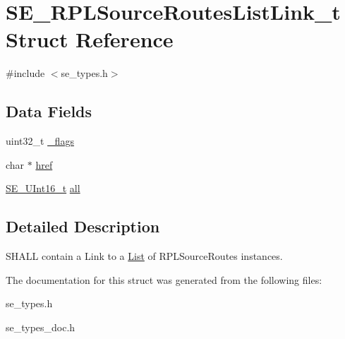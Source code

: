 \hypertarget{structSE__RPLSourceRoutesListLink__t}{}\section{S\+E\+\_\+\+R\+P\+L\+Source\+Routes\+List\+Link\+\_\+t Struct Reference}
\label{structSE__RPLSourceRoutesListLink__t}


{\ttfamily \#include $<$se\+\_\+types.\+h$>$}

\subsection*{Data Fields}
\begin{DoxyCompactItemize}
\item 
uint32\+\_\+t \hyperlink{group__RPLSourceRoutesListLink_gacc50a570981ab981f8533f4d7d12163e}{\+\_\+flags}
\item 
char $\ast$ \hyperlink{group__RPLSourceRoutesListLink_ga2118dad3467a725136fbaab7690c77a8}{href}
\item 
\hyperlink{group__UInt16_gac68d541f189538bfd30cfaa712d20d29}{S\+E\+\_\+\+U\+Int16\+\_\+t} \hyperlink{group__RPLSourceRoutesListLink_ga13f0e416ff1e772889d728cec3e02672}{all}
\end{DoxyCompactItemize}


\subsection{Detailed Description}
S\+H\+A\+LL contain a Link to a \hyperlink{structList}{List} of R\+P\+L\+Source\+Routes instances. 

The documentation for this struct was generated from the following files\+:\begin{DoxyCompactItemize}
\item 
se\+\_\+types.\+h\item 
se\+\_\+types\+\_\+doc.\+h\end{DoxyCompactItemize}
